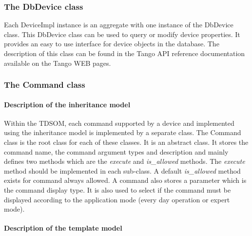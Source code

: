 \subsubsection{The DbDevice class}

Each DeviceImpl instance is an aggregate with one instance of the
DbDevice class. This DbDevice class can be used to
query or modify device properties. It provides
an easy to use interface for device objects in the database. The description
of this class can be found in the Tango API reference documentation
available on the Tango WEB pages.


\subsubsection{The Command class}


\paragraph{Description of the inheritance model}

Within the TDSOM, each command supported by a device
and implemented using the inheritance model is implemented by a separate
class. The Command class is the root class for each
of these classes. It is an abstract class. It stores the command name,
the command argument types and description and mainly defines two
methods which are the \emph{execute} and \emph{is\_allowed}
methods. The \emph{execute} method should be implemented
in each sub-class. A default \emph{is\_allowed} method exists for
command always allowed. A command also stores a parameter which is
the command display type. It is also used to select if the command
must be displayed according to the application mode (every day operation
or expert mode).


\paragraph{Description of the template model}

